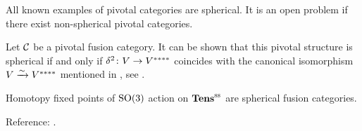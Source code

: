 \begin{remark}
  All known examples of pivotal categories are spherical. It is an open problem
  if there exist non-spherical pivotal categories.
\end{remark}

\begin{remark}
  Let $\mathcal{C}$ be a pivotal fusion category. It can be shown that this
  pivotal structure is spherical if and only if $\delta^2\colon V\to V^{****}$
  coincides with the canonical isomorphism $V\xrightarrow{\sim} V^{****}$ mentioned in
  , see \cite[Proposition 3.5.4]{dsps-dualizable}.
\end{remark}

\begin{conjecture}
  Homotopy fixed points of $\mathrm{SO}(3)$ action on $\mathbf{Tens}^{\mathrm{ss}}$ are spherical fusion
  categories.
\end{conjecture}
Reference: \cite[Conjecture 3.5.10]{dsps-dualizable}.